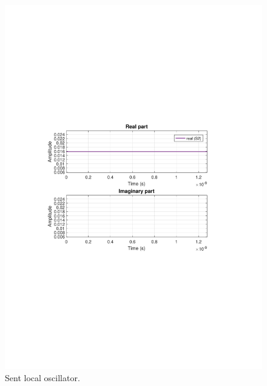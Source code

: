 \documentclass{article}
\begin{document}
\begin{figure}[H]
\centering
\includegraphics[width=\linewidth, trim= 0mm 100mm 0mm 100mm, clip]{lo.pdf}
\caption{Sent local oscillator.}
\label{fig:bsin2}
\end{figure}
\end{document}
